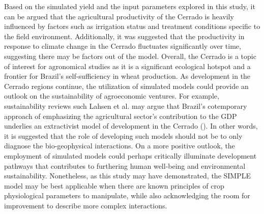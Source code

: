 \documentclass[a4paper,12pt,oneside]{article}
\begin{document}
Based on the simulated yield and the input parameters explored in this study, it can be argued that the agricultural productivity of the Cerrado is heavily influenced by factors such as irrigation status and treatment conditions specific to the field environment. Additionally, it was suggested that the productivity in response to climate change in the Cerrado fluctuates significantly over time, suggesting there may be factors out of the model. Overall, the Cerrado is a topic of interest for agronomical studies as it is a significant ecological hotspot and a frontier for Brazil’s self-sufficiency in wheat production. As development in the Cerrado regions continue, the utilization of simulated models could provide an outlook on the sustainability of agroeconomic ventures.  For example, sustainability reviews such Lahsen et al. may argue that Brazil’s cotemporary approach of emphasizing the agricultural sector’s contribution to the GDP underlies an extractivist model of development in the Cerrado (\cite{lahsen-2016-under-overex}). In other words, it is suggested that the role of developing such models should not be to only diagnose the bio-geophysical interactions. On a more positive outlook, the employment of simulated models could perhaps critically illuminate development pathways that contributes to furthering human well-being and environmental sustainability. Nonetheless, as this study may have demonstrated, the SIMPLE model may be best applicable when there are known principles of crop physiological parameters to manipulate, while also acknowledging the room for improvement to describe more complex interactions.



\printbibliography
\end{document}
